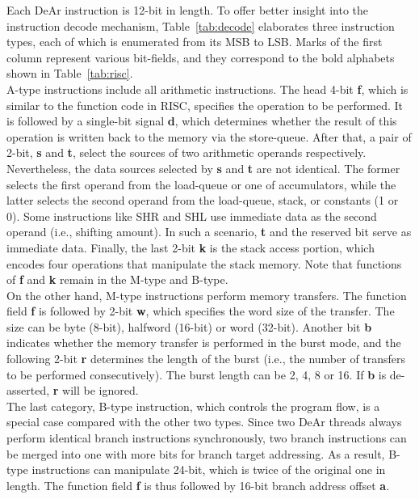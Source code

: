 Each DeAr instruction is 12-bit in length.
To offer better insight into the instruction decode mechanism, 
Table~\ref{tab:decode} elaborates three instruction types, 
each of which is enumerated from its MSB to LSB.
Marks of the first column represent various bit-fields, 
and they correspond to the bold alphabets shown in Table~\ref{tab:risc}.
\\\indent
A-type instructions include all arithmetic instructions.
The head 4-bit \textbf{f}, which is similar to the function code in RISC, specifies the operation to be performed.
It is followed by a single-bit signal \textbf{d}, which determines whether the result of this operation is written back to the memory via the store-queue.
After that, a pair of 2-bit, \textbf{s} and \textbf{t}, select the sources of two arithmetic operands respectively. 
Nevertheless, the data sources selected by \textbf{s} and \textbf{t} are not identical.
The former selects the first operand from the load-queue or one of accumulators, 
while the latter selects the second operand from the load-queue, stack, or constants (1 or 0).
Some instructions like SHR and SHL use immediate data as the second operand (i.e., shifting amount).
In such a scenario, \textbf{t} and the reserved bit serve as immediate data.
Finally, the last 2-bit \textbf{k} is the stack access portion, which encodes four operations that manipulate the stack memory.
Note that functions of \textbf{f} and \textbf{k} remain in the M-type and B-type.
\\\indent 
On the other hand, M-type instructions perform memory transfers.
The function field \textbf{f} is followed by 2-bit \textbf{w}, 
which specifies the word size of the transfer.
The size can be byte (8-bit), halfword (16-bit) or word (32-bit).
Another bit \textbf{b} indicates whether the memory transfer is performed in the burst mode, 
and the following 2-bit \textbf{r} determines the length of the burst (i.e., the number of transfers to be performed consecutively).
The burst length can be 2, 4, 8 or 16.
If \textbf{b} is de-asserted, \textbf{r} will be ignored.
\\\indent 
The last category, B-type instruction, which controls the program flow, 
is a special case compared with the other two types.
Since two DeAr threads always perform identical branch instructions synchronously, 
two branch instructions can be merged into one with more bits for branch target addressing.
As a result, B-type instructions can manipulate 24-bit, which is twice of the original one in length.
The function field \textbf{f} is thus followed by 16-bit branch address offset \textbf{a}.

